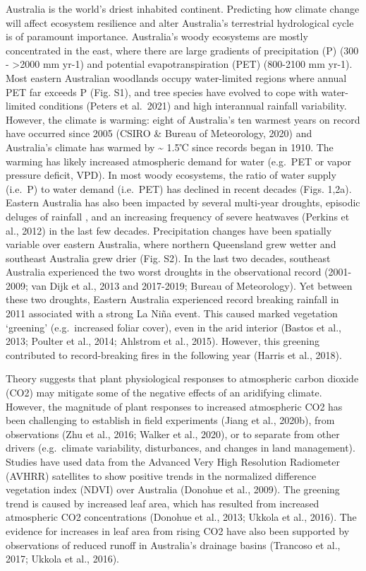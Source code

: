 \documentclass[gc, manuscript]{copernicus}
\begin{document}


\introduction[Introduction]Australia is the world's driest inhabited
continent. Predicting how climate change will affect ecosystem
resilience and alter Australia's terrestrial hydrological cycle is of
paramount importance. Australia's woody ecosystems are mostly
concentrated in the east, where there are large gradients of
precipitation (P) (300 - \textgreater2000 mm yr-1) and potential
evapotranspiration (PET) (800-2100 mm yr-1). Most eastern Australian
woodlands occupy water-limited regions where annual PET far exceeds P
(Fig. S1), and tree species have evolved to cope with water-limited
conditions (Peters et al.~2021) and high interannual rainfall
variability. However, the climate is warming: eight of Australia's ten
warmest years on record have occurred since 2005 (CSIRO \& Bureau of
Meteorology, 2020) and Australia's climate has warmed by
\textasciitilde{} 1.5℃ since records began in 1910. The warming has
likely increased atmospheric demand for water (e.g.~PET or vapor
pressure deficit, VPD). In most woody ecosystems, the ratio of water
supply (i.e.~P) to water demand (i.e.~PET) has declined in recent
decades (Figs. 1,2a). Eastern Australia has also been impacted by
several multi-year droughts, episodic deluges of rainfall
\citep{king_role_2020}, and an increasing frequency of severe heatwaves
(Perkins et al., 2012) in the last few decades. Precipitation changes
have been spatially variable over eastern Australia, where northern
Queensland grew wetter and southeast Australia grew drier (Fig. S2). In
the last two decades, southeast Australia experienced the two worst
droughts in the observational record (2001-2009; van Dijk et al., 2013
and 2017-2019; Bureau of Meteorology). Yet between these two droughts,
Eastern Australia experienced record breaking rainfall in 2011
associated with a strong La Niña event. This caused marked vegetation
`greening' (e.g.~increased foliar cover), even in the arid interior
(Bastos et al., 2013; Poulter et al., 2014; Ahlstrom et al., 2015).
However, this greening contributed to record-breaking fires in the
following year (Harris et al., 2018).

Theory suggests that plant physiological responses to atmospheric carbon
dioxide (CO2) may mitigate some of the negative effects of an aridifying
climate. However, the magnitude of plant responses to increased
atmospheric CO2 has been challenging to establish in field experiments
(Jiang et al., 2020b), from observations (Zhu et al., 2016; Walker et
al., 2020), or to separate from other drivers (e.g.~climate variability,
disturbances, and changes in land management). Studies have used data
from the Advanced Very High Resolution Radiometer (AVHRR) satellites to
show positive trends in the normalized difference vegetation index
(NDVI) over Australia (Donohue et al., 2009). The greening trend is
caused by increased leaf area, which has resulted from increased
atmospheric CO2 concentrations (Donohue et al., 2013; Ukkola et al.,
2016). The evidence for increases in leaf area from rising CO2 have also
been supported by observations of reduced runoff in Australia's drainage
basins (Trancoso et al., 2017; Ukkola et al., 2016).
\end{document}
